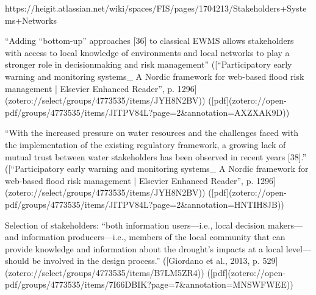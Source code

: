 {{https://heigit.atlassian.net/wiki/spaces/FIS/pages/1704213/Stakeholders+Systems+Networks

“Adding “bottom-up” approaches [36] to classical EWMS allows stakeholders with access to local knowledge of environments and local networks to play a stronger role in decisionmaking and risk management” ([“Participatory early warning and monitoring systems_ A Nordic framework for web-based flood risk management | Elsevier Enhanced Reader”, p. 1296](zotero://select/groups/4773535/items/JYH8N2BV)) ([pdf](zotero://open-pdf/groups/4773535/items/JITPV84L?page=2&annotation=AXZXAK9D))

“With the increased pressure on water resources and the challenges faced with the implementation of the existing regulatory framework, a growing lack of mutual trust between water stakeholders has been observed in recent years [38].” ([“Participatory early warning and monitoring systems_ A Nordic framework for web-based flood risk management | Elsevier Enhanced Reader”, p. 1296](zotero://select/groups/4773535/items/JYH8N2BV)) ([pdf](zotero://open-pdf/groups/4773535/items/JITPV84L?page=2&annotation=HNTIH8JB))

Selection of stakeholders:
“both information users—i.e., local decision makers—and information producers—i.e., members of the local community that can provide knowledge and information about the drought’s impacts at a local level—should be involved in the design process.” ([Giordano et al., 2013, p. 529](zotero://select/groups/4773535/items/B7LM5ZR4)) ([pdf](zotero://open-pdf/groups/4773535/items/7I66DBIK?page=7\&annotation=MNSWFWEE))

}}
